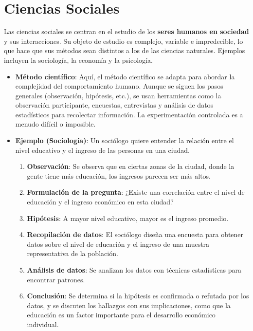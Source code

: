 \documentclass{article}
\begin{document}
\section*{Ciencias Sociales}

Las ciencias sociales se centran en el estudio de los \textbf{seres humanos en
sociedad} y sus interacciones. Su objeto de estudio es complejo, variable e
impredecible, lo que hace que sus métodos sean distintos a los de las
ciencias naturales. Ejemplos incluyen la sociología, la economía y la
psicología.

\begin{itemize}
  \item \textbf{Método científico}: Aquí, el método científico se adapta
    para abordar la complejidad del comportamiento humano. Aunque se siguen
    los pasos generales (observación, hipótesis, etc.), se usan herramientas
    como la observación participante, encuestas, entrevistas y análisis de
    datos estadísticos para recolectar información. La experimentación
    controlada es a menudo difícil o imposible.
  \item \textbf{Ejemplo (Sociología)}: Un sociólogo quiere entender la
    relación entre el nivel educativo y el ingreso de las personas en una
    ciudad.
    \begin{enumerate}
      \item \textbf{Observación}: Se observa que en ciertas zonas de la
        ciudad, donde la gente tiene más educación, los ingresos parecen ser
        más altos.
      \item \textbf{Formulación de la pregunta}: ¿Existe una correlación
        entre el nivel de educación y el ingreso económico en esta ciudad?
      \item \textbf{Hipótesis}: A mayor nivel educativo, mayor es el
        ingreso promedio.
      \item \textbf{Recopilación de datos}: El sociólogo diseña una encuesta
        para obtener datos sobre el nivel de educación y el ingreso de una
        muestra representativa de la población.
      \item \textbf{Análisis de datos}: Se analizan los datos con técnicas
        estadísticas para encontrar patrones.
      \item \textbf{Conclusión}: Se determina si la hipótesis es confirmada o
        refutada por los datos, y se discuten los hallazgos con sus
        implicaciones, como que la educación es un factor importante para el
        desarrollo económico individual.
    \end{enumerate}
\end{itemize}
\end{document}

